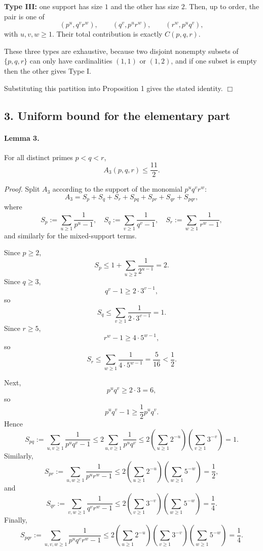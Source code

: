 \medskip
\noindent\textbf{Type III:} one support has size \(1\) and the other has size \(2\).  
Then, up to order, the pair is one of
\[
(p^u,q^v r^w),\qquad (q^v,p^u r^w),\qquad (r^w,p^u q^v),
\]
with \(u,v,w\ge 1\). Their total contribution is exactly \(C(p,q,r)\).

\medskip
These three types are exhaustive, because two disjoint nonempty subsets of \(\{p,q,r\}\) can only have cardinalities \((1,1)\) or \((1,2)\), and if one subset is empty then the other gives Type I.

Substituting this partition into Proposition 1 gives the stated identity.
\hfill\(\Box\)

\subsection*{3. Uniform bound for the elementary part}

\paragraph{Lemma 3.}
For all distinct primes \(p<q<r\),
\[
A_3(p,q,r)\le \frac{11}{2}.
\]

\emph{Proof.}
Split \(A_3\) according to the support of the monomial \(p^u q^v r^w\):
\[
A_3=S_p+S_q+S_r+S_{pq}+S_{pr}+S_{qr}+S_{pqr},
\]
where
\[
S_p:=\sum_{u\ge 1}\frac{1}{p^u-1},
\quad
S_q:=\sum_{v\ge 1}\frac{1}{q^v-1},
\quad
S_r:=\sum_{w\ge 1}\frac{1}{r^w-1},
\]
and similarly for the mixed-support terms.

Since \(p\ge 2\),
\[
S_p
\le
1+\sum_{u\ge 2}\frac{1}{2^{u-1}}
=2.
\]
Since \(q\ge 3\),
\[
q^v-1\ge 2\cdot 3^{v-1},
\]
so
\[
S_q\le \sum_{v\ge 1}\frac{1}{2\cdot 3^{v-1}}=1.
\]
Since \(r\ge 5\),
\[
r^w-1\ge 4\cdot 5^{w-1},
\]
so
\[
S_r\le \sum_{w\ge 1}\frac{1}{4\cdot 5^{w-1}}=\frac{5}{16}<\frac12.
\]

Next,
\[
p^u q^v\ge 2\cdot 3=6,
\]
so
\[
p^u q^v-1\ge \frac12 p^u q^v.
\]
Hence
\[
S_{pq}:=\sum_{u,v\ge 1}\frac{1}{p^u q^v-1}
\le
2\sum_{u,v\ge 1}\frac{1}{p^u q^v}
\le
2\left(\sum_{u\ge 1}2^{-u}\right)\left(\sum_{v\ge 1}3^{-v}\right)=1.
\]
Similarly,
\[
S_{pr}:=\sum_{u,w\ge 1}\frac{1}{p^u r^w-1}
\le
2\left(\sum_{u\ge 1}2^{-u}\right)\left(\sum_{w\ge 1}5^{-w}\right)=\frac12,
\]
and
\[
S_{qr}:=\sum_{v,w\ge 1}\frac{1}{q^v r^w-1}
\le
2\left(\sum_{v\ge 1}3^{-v}\right)\left(\sum_{w\ge 1}5^{-w}\right)=\frac14.
\]
Finally,
\[
S_{pqr}:=\sum_{u,v,w\ge 1}\frac{1}{p^u q^v r^w-1}
\le
2\left(\sum_{u\ge 1}2^{-u}\right)\left(\sum_{v\ge 1}3^{-v}\right)\left(\sum_{w\ge 1}5^{-w}\right)=\frac14.
\]

